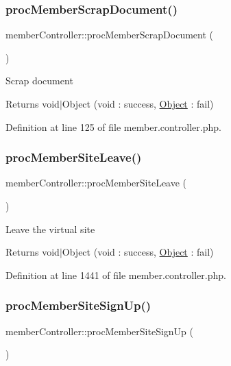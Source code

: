 \subsubsection{\texorpdfstring{proc\+Member\+Scrap\+Document()}{procMemberScrapDocument()}}
{\footnotesize\ttfamily member\+Controller\+::proc\+Member\+Scrap\+Document (\begin{DoxyParamCaption}{ }\end{DoxyParamCaption})}

Scrap document

\begin{DoxyReturn}{Returns}
void$\vert$\+Object (void \+: success, \hyperlink{classObject}{Object} \+: fail) 
\end{DoxyReturn}


Definition at line 125 of file member.\+controller.\+php.

\mbox{\label{classmemberController_a46240bb8dbfcff52844ce8387076ca61}} 
\subsubsection{\texorpdfstring{proc\+Member\+Site\+Leave()}{procMemberSiteLeave()}}
{\footnotesize\ttfamily member\+Controller\+::proc\+Member\+Site\+Leave (\begin{DoxyParamCaption}{ }\end{DoxyParamCaption})}

Leave the virtual site

\begin{DoxyReturn}{Returns}
void$\vert$\+Object (void \+: success, \hyperlink{classObject}{Object} \+: fail) 
\end{DoxyReturn}


Definition at line 1441 of file member.\+controller.\+php.

\mbox{\label{classmemberController_a4dfc326f5bc6d97b86b919c568457000}} 
\subsubsection{\texorpdfstring{proc\+Member\+Site\+Sign\+Up()}{procMemberSiteSignUp()}}
{\footnotesize\ttfamily member\+Controller\+::proc\+Member\+Site\+Sign\+Up (\begin{DoxyParamCaption}{ }\end{DoxyParamCaption})}

